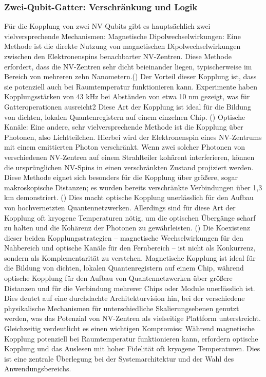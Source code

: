 \subsubsection{Zwei-Qubit-Gatter: Verschränkung und Logik}
Für die Kopplung von zwei NV-Qubits gibt es hauptsächlich zwei vielversprechende Mechanismen:
Magnetische Dipolwechselwirkungen: Eine Methode ist die direkte Nutzung von magnetischen Dipolwechselwirkungen zwischen den Elektronenspins benachbarter NV-Zentren. Diese Methode erfordert, dass die NV-Zentren sehr dicht beieinander liegen, typischerweise im Bereich von mehreren zehn Nanometern.(\cite{NVZentrenStickstoffFehlstellenDLR}) Der Vorteil dieser Kopplung ist, dass sie potenziell auch bei Raumtemperatur funktionieren kann. Experimente haben Kopplungsstärken von 43 kHz bei Abständen von etwa 10 nm gezeigt, was für Gatteroperationen ausreicht2 Diese Art der Kopplung ist ideal für die Bildung von dichten, lokalen Quantenregistern auf einem einzelnen Chip. (\cite{childressDiamondNVCenters2013}) 
Optische Kanäle: Eine andere, sehr vielversprechende Methode ist die Kopplung über Photonen, also Lichtteilchen. Hierbei wird der Elektronenspin eines NV-Zentrums mit einem emittierten Photon verschränkt. Wenn zwei solcher Photonen von verschiedenen NV-Zentren auf einem Strahlteiler kohärent interferieren, können die ursprünglichen NV-Spins in einen verschränkten Zustand projiziert werden. Diese Methode eignet sich besonders für die Kopplung über größere, sogar makroskopische Distanzen; es wurden bereits verschränkte Verbindungen über 1,3 km demonstriert. (\cite{OperationsNVCenter})  Dies macht optische Kopplung unerlässlich für den Aufbau von hochvernetzten Quantennetzwerken. Allerdings sind für diese Art der Kopplung oft kryogene Temperaturen nötig, um die optischen Übergänge scharf zu halten und die Kohärenz der Photonen zu gewährleisten. (\cite{childressDiamondNVCenters2013}) 
Die Koexistenz dieser beiden Kopplungsstrategien – magnetische Wechselwirkungen für den Nahbereich und optische Kanäle für den Fernbereich – ist nicht als Konkurrenz, sondern als Komplementarität zu verstehen. Magnetische Kopplung ist ideal für die Bildung von dichten, lokalen Quantenregistern auf einem Chip, während optische Kopplung für den Aufbau von Quantennetzwerken über größere Distanzen und für die Verbindung mehrerer Chips oder Module unerlässlich ist. Dies deutet auf eine durchdachte Architekturvision hin, bei der verschiedene physikalische Mechanismen für unterschiedliche Skalierungsebenen genutzt werden, was das Potenzial von NV-Zentren als vielseitige Plattform unterstreicht. Gleichzeitig verdeutlicht es einen wichtigen Kompromiss: Während magnetische Kopplung potenziell bei Raumtemperatur funktionieren kann, erfordern optische Kopplung und das Auslesen mit hoher Fidelität oft kryogene Temperaturen. Dies ist eine zentrale Überlegung bei der Systemarchitektur und der Wahl des Anwendungsbereichs.

